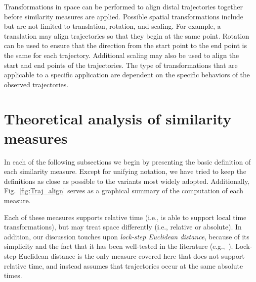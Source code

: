 \documentclass[10pt,letterpaper]{article}
\begin{document}
Transformations in space can be performed to align distal trajectories together before similarity measures are applied. Possible spatial transformations include but are not limited to translation, rotation, and scaling. For example, a translation may align trajectories so that they begin at the same point. Rotation can be used to ensure that the direction from the start point to the end point is the same for each trajectory. Additional scaling may also be used to align the start and end points of the trajectories. The type of transformations that are applicable to a specific application are dependent on the specific behaviors of the observed trajectories. 


\section{Theoretical analysis of similarity measures}

In each of the following subsections we begin by presenting the basic definition of each similarity measure. Except for unifying notation, we have tried to keep the definitions as close as possible to the variants most widely adopted. Additionally, Fig.~\ref{fig:Traj_align} serves as a graphical summary of the computation of each measure.%

Each of these measures supports relative time (i.e., is able to support local time transformations), but may treat space differently (i.e., relative or absolute). In addition, our discussion touches upon \emph{lock-step Euclidean distance}, because of its simplicity and the fact that it has been well-tested in the literature (e.g.,~\cite{nanni2006time}). Lock-step Euclidean distance is the only measure covered here that does not support relative time, and instead assumes that trajectories occur at the same absolute times.
\end{document}

